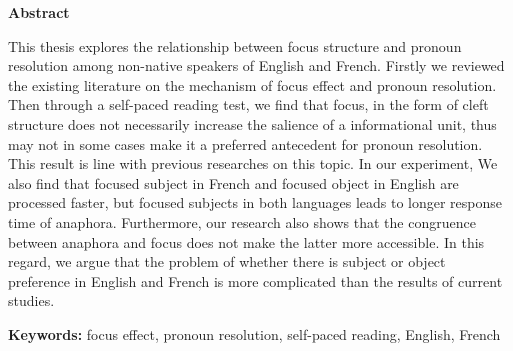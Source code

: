 \clearpage
\thispagestyle{plain}
{}

\centerline{\bfseries Abstract}

\linespread{1.4}
\bigskip

This thesis explores the relationship between focus structure and pronoun resolution among non-native speakers of English and French. Firstly we reviewed the existing literature on the mechanism of focus effect and pronoun resolution. Then through a self-paced reading test, we find that focus, in the form of cleft structure does not necessarily increase the salience of a informational unit, thus may not in some cases make it a preferred antecedent for pronoun resolution. This result is line with previous researches on this topic. In our experiment, We also find that focused subject in French and focused object in English are processed faster, but focused subjects in both languages leads to longer response time of anaphora. Furthermore, our research also shows that the congruence between anaphora and focus does not make the latter more accessible. In this regard, we argue that the problem of whether there is subject or object preference in English and French is more complicated than the results of current studies.

\bigskip
\noindent\textbf{ Keywords:} 
focus effect, pronoun resolution, self-paced reading, English, French

